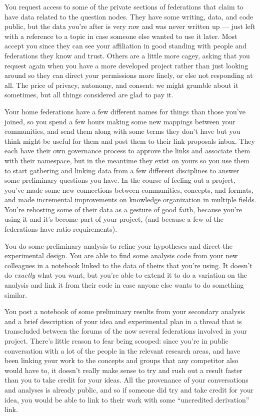 You request access to some of the private sections of federations that
claim to have data related to the question nodes. They have some
writing, data, and code public, but the data you're after is very raw
and was never written up --- just left with a reference to a topic in
case someone else wanted to use it later. Most accept you since they can
see your affiliation in good standing with people and federations they
know and trust. Others are a little more cagey, asking that you request
again when you have a more developed project rather than just looking
around so they can direct your permissions more finely, or else not
responding at all. The price of privacy, autonomy, and consent: we might
grumble about it sometimes, but all things considered are glad to pay
it.

Your home federations have a few different names for things than those
you've joined, so you spend a few hours making some new mappings between
your communities, and send them along with some terms they don't have
but you think might be useful for them and post them to their link
proposals inbox. They each have their own governance process to approve
the links and associate them with their namespace, but in the meantime
they exist on yours so you use them to start gathering and linking data
from a few different disciplines to answer some preliminary questions
you have. In the course of feeling out a project, you've made some new
connections between communities, concepts, and formats, and made
incremental improvements on knowledge organization in multiple fields.
You're rehosting some of their data as a gesture of good faith, because
you're using it and it's become part of your project, (and because a few
of the federations have ratio requirements).

You do some preliminary analysis to refine your hypotheses and direct
the experimental design. You are able to find some analysis code from
your new colleagues in a notebook linked to the data of theirs that
you're using. It doesn't do \emph{exactly} what you want, but you're
able to extend it to do a variation on the analysis and link it from
their code in case anyone else wants to do something similar.

You post a notebook of some preliminary results from your secondary
analysis and a brief description of your idea and experimental plan in a
thread that is transcluded between the forums of the now several
federations involved in your project. There's little reason to fear
being scooped: since you're in public conversation with a lot of the
people in the relevant research areas, and have been linking your work
to the concepts and groups that any competitor also would have to, it
doesn't really make sense to try and rush out a result faster than you
to take credit for your ideas. All the provenance of your conversations
and analyses is already public, and so if someone did try and take
credit for your idea, you would be able to link to their work with some
``uncredited derivation'' link.

